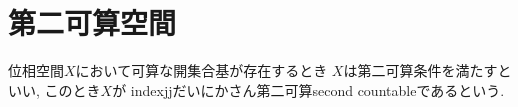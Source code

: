 \documentclass[uplatex, dvipdfmx, a4paper, 12pt, class=jsbook, crop=false]{standalone}
\begin{document}
\section{第二可算空間}
\label{sec:second-countable-spaces}

\begin{definition}
	位相空間$ X $において可算な開集合基が存在するとき
	$ X $は第二可算条件を満たすといい, このとき$ X $が
	indexjj{だいにかさん}{第二可算}{second countable}であるという.
\end{definition}
\end{document}
